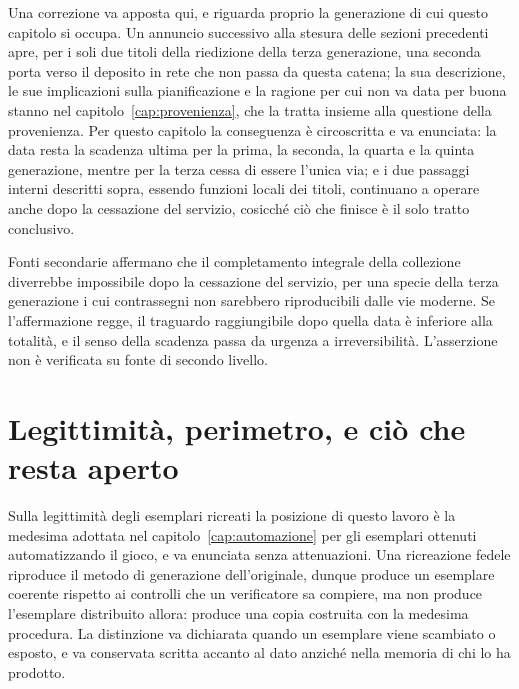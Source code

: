 Una correzione va apposta qui, e riguarda proprio la generazione di cui questo capitolo si occupa. Un annuncio successivo alla stesura delle sezioni precedenti apre, per i soli due titoli della riedizione della terza generazione, una seconda porta verso il deposito in rete che non passa da questa catena; la sua descrizione, le sue implicazioni sulla pianificazione e la ragione per cui non va data per buona stanno nel capitolo~\ref{cap:provenienza}, che la tratta insieme alla questione della provenienza. Per questo capitolo la conseguenza è circoscritta e va enunciata: la data resta la scadenza ultima per la prima, la seconda, la quarta e la quinta generazione, mentre per la terza cessa di essere l'unica via; e i due passaggi interni descritti sopra, essendo funzioni locali dei titoli, continuano a operare anche dopo la cessazione del servizio, cosicché ciò che finisce è il solo tratto conclusivo.

\begin{daverificare}
Fonti secondarie affermano che il completamento integrale della collezione diverrebbe impossibile dopo la cessazione del servizio, per una specie della terza generazione i cui contrassegni non sarebbero riproducibili dalle vie moderne. Se l'affermazione regge, il traguardo raggiungibile dopo quella data è inferiore alla totalità, e il senso della scadenza passa da urgenza a irreversibilità. L'asserzione non è verificata su fonte di secondo livello.
\end{daverificare}

\section{Legittimità, perimetro, e ciò che resta aperto}

Sulla legittimità degli esemplari ricreati la posizione di questo lavoro è la medesima adottata nel capitolo~\ref{cap:automazione} per gli esemplari ottenuti automatizzando il gioco, e va enunciata senza attenuazioni. Una ricreazione fedele riproduce il metodo di generazione dell'originale, dunque produce un esemplare coerente rispetto ai controlli che un verificatore sa compiere, ma non produce l'esemplare distribuito allora: produce una copia costruita con la medesima procedura. La distinzione va dichiarata quando un esemplare viene scambiato o esposto, e va conservata scritta accanto al dato anziché nella memoria di chi lo ha prodotto.

